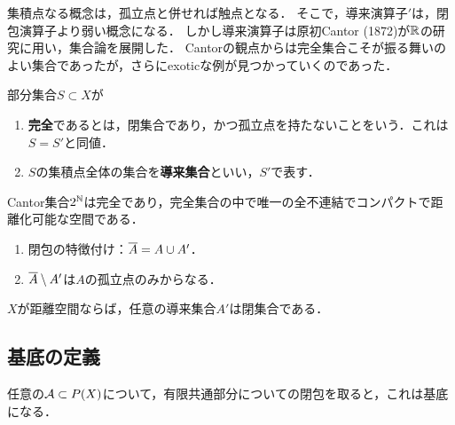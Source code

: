 \documentclass[uplatex,dvipdfmx]{jsreport}
\begin{document}
\begin{tcolorbox}[colframe=ForestGreen, colback=ForestGreen!10!white,breakable,colbacktitle=ForestGreen!40!white,coltitle=black,fonttitle=\bfseries\sffamily,
title=]
    集積点なる概念は，孤立点と併せれば触点となる．
    そこで，導来演算子$'$は，閉包演算子より弱い概念になる．
    しかし導来演算子は原初Cantor (1872)が$\mathbb{R}$の研究に用い，集合論を展開した．
    Cantorの観点からは完全集合こそが振る舞いのよい集合であったが，さらにexoticな例が見つかっていくのであった．
\end{tcolorbox}

\begin{definition}
    部分集合$S\subset X$が
    \begin{enumerate}
        \item \textbf{完全}であるとは，閉集合であり，かつ孤立点を持たないことをいう．これは$S=S'$と同値．
        \item $S$の集積点全体の集合を\textbf{導来集合}といい，$S'$で表す．
    \end{enumerate}
\end{definition}

\begin{example}
    Cantor集合$2^{\mathbb{N}}$は完全であり，完全集合の中で唯一の全不連結でコンパクトで距離化可能な空間である．
\end{example}

\begin{proposition}[導来作用素の性質]\mbox{}
    \begin{enumerate}
        \item 閉包の特徴付け：$\overline{A}=A\cup A'$．
        \item $\overline{A}\setminus A'$は$A$の孤立点のみからなる．
    \end{enumerate}
\end{proposition}

\begin{proposition}
    $X$が距離空間ならば，任意の導来集合$A'$は閉集合である．
\end{proposition}

\subsection{基底の定義}

\begin{tcolorbox}[colframe=ForestGreen, colback=ForestGreen!10!white,breakable,colbacktitle=ForestGreen!40!white,coltitle=black,fonttitle=\bfseries\sffamily,
title=]
    任意の$\mathcal{A}\subset P(X)$について，有限共通部分についての閉包を取ると，これは基底になる．
\end{tcolorbox}
\end{document}
